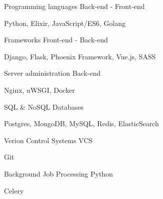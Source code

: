 \begin{cventries}
  \cventry
    {Programming languages}
    {Back-end - Front-end}
    {}
    {}
    {
      \begin{cvitems}
        \item {Python, Elixir, JavaScript/ES6, Golang}
      \end{cvitems}
    }
  \cventry
    {Frameworks}
    {Front-end - Back-end}
    {}
    {}
    {
      \begin{cvitems}
        \item {Django, Flask, Phoenix Framework, Vue.js, SASS}
      \end{cvitems}
    }
  \cventry
    {Server administration}
    {Back-end}
    {}
    {}
    {
      \begin{cvitems}
        \item {Nginx, uWSGI, Docker}
      \end{cvitems}
    }
  \cventry
    {SQL \& NoSQL}
    {Databases}
    {}
    {}
    {
      \begin{cvitems}
        \item {Postgres, MongoDB, MySQL, Redis, ElasticSearch}
      \end{cvitems}
    }
  \cventry
    {Verion Control Systems}
    {VCS}
    {}
    {}
    {
      \begin{cvitems}
        \item {Git}
      \end{cvitems}
    }
  \cventry
    {Background Job Processing}
    {Python}
    {}
    {}
    {
      \begin{cvitems}
        \item {Celery}
      \end{cvitems}
    }
\end{cventries}
